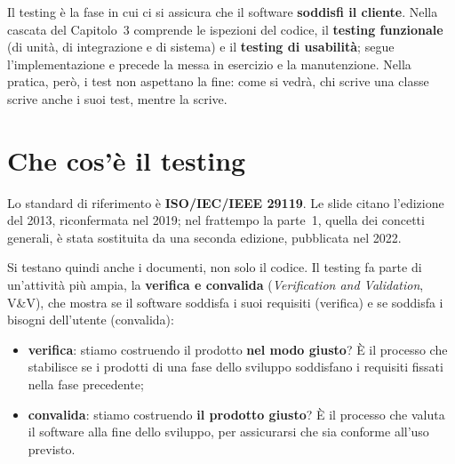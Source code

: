 
Il testing è la fase in cui ci si assicura che il software \textbf{soddisfi il cliente}. Nella cascata del Capitolo~3
comprende le ispezioni del codice, il \textbf{testing funzionale} (di unità, di integrazione e di sistema) e il
\textbf{testing di usabilità}; segue l'implementazione e precede la messa in esercizio e la manutenzione. Nella pratica,
però, i test non aspettano la fine: come si vedrà, chi scrive una classe scrive anche i suoi test, mentre la scrive.

\section{Che cos'è il testing}

Lo standard di riferimento è \textbf{ISO/IEC/IEEE 29119}. Le slide citano l'edizione del 2013, riconfermata nel 2019;
nel frattempo la parte~1, quella dei concetti generali, è stata sostituita da una seconda edizione, pubblicata nel
2022.


Si testano quindi anche i documenti, non solo il codice. Il testing fa parte di un'attività più ampia, la
\textbf{verifica e convalida} (\textit{Verification and Validation}, V\&V), che mostra se il software soddisfa i suoi
requisiti (verifica) e se soddisfa i bisogni dell'utente (convalida):

\begin{itemize}
  \item \textbf{verifica}: stiamo costruendo il prodotto \textbf{nel modo giusto}? È il processo che stabilisce se i
        prodotti di una fase dello sviluppo soddisfano i requisiti fissati nella fase precedente;
  \item \textbf{convalida}: stiamo costruendo \textbf{il prodotto giusto}? È il processo che valuta il software alla
        fine dello sviluppo, per assicurarsi che sia conforme all'uso previsto.
\end{itemize}

